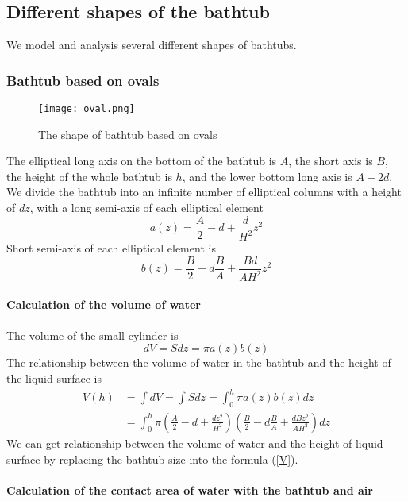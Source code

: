 \documentclass{mcmthesis}
\begin{document}
\subsection{Different shapes of the bathtub}
We model and analysis several different shapes of bathtubs.
\subsubsection{Bathtub based on ovals}
\begin{figure}[H]
\centerline{\texttt{[image: oval.png]}}
\caption{The shape of bathtub based on ovals}
\label{oval}	
\end{figure}
The elliptical long axis on the bottom of the bathtub is $A$, the short axis is $B$, the height of the whole bathtub is $h$, and the lower bottom long axis is $A-2d$.\\
\indent We divide the bathtub into an infinite number of elliptical columns with a height of $dz$, with a long semi-axis of each elliptical element\\
\begin{equation}
a(z)=\frac{A}{2}-d+\frac{d}{{H}^{2}}{z}^{2}
\end{equation}
\indent Short semi-axis of each elliptical element is
\begin{equation}
b(z)=\frac{B}{2}-d\frac{B}{A}+\frac{Bd}{A{H}^{2}}{z}^{2}
\end{equation}\\
\textbf{Calculation of the volume of water} \\\\
\indent The volume of the small cylinder is
\begin{equation}
dV=Sdz=\pi a(z)b(z)
\end{equation}
\indent The relationship between the volume of water in the bathtub and the height of the liquid surface is
\begin{equation}
\begin{split}
V(h)&=\int dV=\int Sdz=\int_{0}^{h}\pi a(z)b(z)dz \\
&=\int_{0}^{h}\pi(\frac{A}{2}-d+\frac{d{z}^{2}}{{H}^{2}})(\frac{B}{2}-d\frac{B}{A}+\frac{dB{z}^{2}}{A{H}^{2}})dz
\label{V}
\end{split}
\end{equation}
\indent We can get relationship between the volume of water and the height of liquid surface by replacing the bathtub size into the formula (\ref{V}).\\\\
\textbf{Calculation of the contact area of water with the bathtub and air} \\\\
\end{document}
